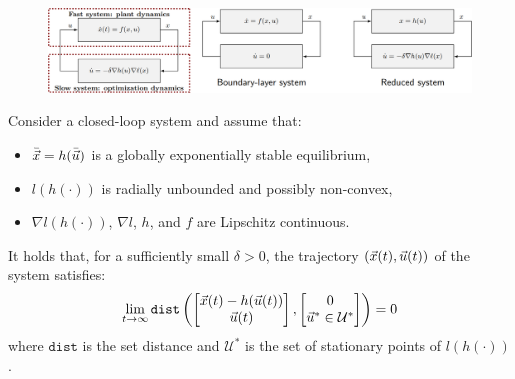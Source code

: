 \begin{description}
\begin{remark}
        \begin{figure}[H]
            \centering
            \includegraphics[width=0.95\linewidth]{./img/feedback_time_scale_theory.png}
        \end{figure}
    
    
    \end{remark}
\end{description}

\begin{theorem}
    Consider a closed-loop system and assume that:
    \begin{itemize}
        \item $\bar{{\vec{x}}} = h(\bar{{\vec{u}}})$ is a globally exponentially stable equilibrium,
        \item $l(h(\cdot))$ is radially unbounded and possibly non-convex,
        \item $\nabla l(h(\cdot))$, $\nabla l$, $h$, and $f$ are Lipschitz continuous.
    \end{itemize}
    It holds that, for a sufficiently small $\delta > 0$, the trajectory $({\vec{x}}(t), {\vec{u}}(t))$ of the system satisfies:
    \[
        \lim_{t \rightarrow \infty} \texttt{dist}\left( \begin{bmatrix} {\vec{x}}(t) - h({\vec{u}}(t)) \\ {\vec{u}}(t) \end{bmatrix}, \begin{bmatrix} 0 \\ {\vec{u}}^* \in \mathcal{U}^* \end{bmatrix} \right) = 0
    \]
    where $\texttt{dist}$ is the set distance and $\mathcal{U}^*$ is the set of stationary points of $l(h(\cdot))$.
\end{theorem}



